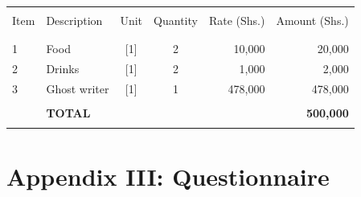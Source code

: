 \begin{center}%
\begin{minipage}{\columnwidth}%
	\centering%
	\label{tbl:Budget}
	\begin{tabular}{llccrr}
		\hline \\
			Item & Description    & Unit      & Quantity  & Rate (Shs.) & Amount (Shs.)    \\
		\\
		\hline \\				
			1    & Food           & [1]       & 2         & 10,000      & 20,000           \\
			2    & Drinks         & [1]       & 2         & 1,000       & 2,000            \\
			3    & Ghost writer   & [1]       & 1         & 478,000     & 478,000          \\
		\\
			 & \textbf{TOTAL} &           &           &             & \textbf{500,000}\\
		\hline \\ 
	\end{tabular}
\end{minipage}
\end{center}

\clearpage  %
\section*{Appendix III: Questionnaire}
%

